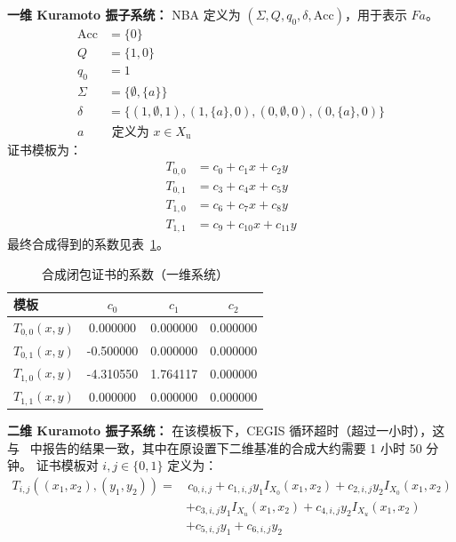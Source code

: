 \textbf{一维 Kuramoto 振子系统：}
NBA 定义为 $(\Sigma, Q, q_0, \delta, \text{Acc})$，用于表示 $F a$。
\begin{align*}
    \text{Acc} &= \{0\} \\
    Q &= \{1, 0\} \\
    q_0 &= 1 \\
    \Sigma &= \{\emptyset, \{a\}\} \\
    \delta &= \{(1, \emptyset, 1), (1, \{a\}, 0), (0, \emptyset, 0), (0, \{a\}, 0)\} \\
	a &\text{ 定义为 } x \in X_{\text{u}}
\end{align*}
证书模板为：
\begin{align*}
    T_{0,0} &= c_0 + c_1 x + c_2 y \\
    T_{0,1} &= c_3 + c_4 x + c_5 y \\
    T_{1,0} &= c_6 + c_7 x + c_8 y \\
    T_{1,1} &= c_9 + c_{10} x + c_{11} y
\end{align*}
最终合成得到的系数见表~\ref{tab:coeff_1d}。

\begin{table}[h]
\centering
\caption{合成闭包证书的系数（一维系统）}
\label{tab:coeff_1d}
\begin{tabular}{lccc}
\hline
\textbf{模板} & $c_0$ & $c_1$ & $c_2$ \\
\hline
$T_{0,0}(x, y)$ & 0.000000 & 0.000000 & 0.000000 \\
$T_{0,1}(x, y)$ & -0.500000 & 0.000000 & 0.000000 \\
$T_{1,0}(x, y)$ & -4.310550 & 1.764117 & 0.000000 \\
$T_{1,1}(x, y)$ & 0.000000 & 0.000000 & 0.000000 \\
\hline
\end{tabular}
\end{table}

\textbf{二维 Kuramoto 振子系统：}
在该模板下，CEGIS 循环超时（超过一小时），这与~\cite{murali2024closure} 中报告的结果一致，其中在原设置下二维基准的合成大约需要 1 小时 50 分钟。
证书模板对 $i, j \in \{0, 1\}$ 定义为：
\begin{align*}
T_{i,j}((x_1, x_2), (y_1, y_2)) = &\, c_{0, i, j} + c_{1, i, j} y_1 I_{X_0}(x_1, x_2) + c_{2, i, j} y_2 I_{X_0}(x_1, x_2) \\
                                  &+ c_{3, i, j} y_1 I_{X_u}(x_1, x_2) + c_{4, i, j} y_2 I_{X_u}(x_1, x_2) \\
                                  &+ c_{5,i,j} y_1 + c_{6,i,j} y_2
\end{align*}

